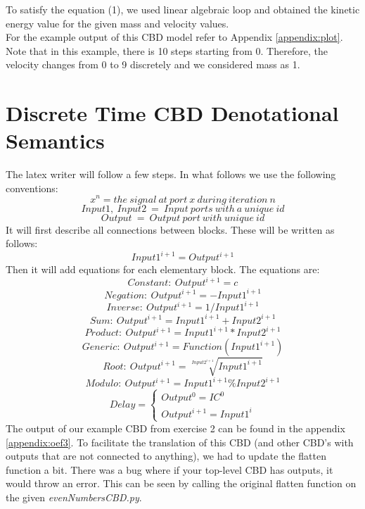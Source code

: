 \documentclass{article}
\begin{document}
To satisfy the equation (1), we used linear algebraic loop and obtained the kinetic energy value for the given mass and velocity values. \\

For the example output of this CBD model refer to Appendix \ref{appendix:plot}. Note that in this example, there is 10 steps starting from 0. Therefore, the velocity changes from 0 to 9 discretely and we considered mass as 1.



\section{Discrete Time CBD Denotational Semantics}
The latex writer will follow a few steps. In what follows we use the following conventions:
\[x^{n} = the\ signal\ at\ port\ x\ during\ iteration\ n\]
\[Input1,\ Input2\ =\ Input\ ports\ with\ a\ unique\ id\]
\[Output\ =\ Output\ port\ with\ unique\ id\]
 It will first describe all connections between blocks. These will be written as follows:
\[Input1^{i+1} = Output^{i+1}\]
Then it will add equations for each elementary block. The equations are:
\[Constant:\ Output^{i+1} = c\]
\[Negation:\ Output^{i+1} = -Input1^{i+1}\]
\[Inverse:\ Output^{i+1} = 1/Input1^{i+1}\]
\[Sum:\ Output^{i+1}=Input1^{i+1}+Input2^{i+1}\]
\[Product:\ Output^{i+1}=Input1^{i+1}*Input2^{i+1}\]
\[Generic:\ Output^{i+1}=Function(Input1^{i+1})\]
\[Root:\ Output^{i+1}=\sqrt[Input2^{i+1}]{Input1^{i+1}}\]
\[Modulo:\ Output^{i+1}=Input1^{i+1}\%Input2^{i+1}\]
\[
 Delay = 
  \begin{cases} 
    Output^{0} = IC^{0}\\
    Output^{i+1} = Input1^{i}
  \end{cases}
\]
The output of our example CBD from exercise 2 can be found in the appendix \ref{appendix:oef3}. To facilitate the translation of this CBD (and other CBD's with outputs that are not connected to anything), we had to update the flatten function a bit. There was a bug where if your top-level CBD has outputs, it would throw an error. This can be seen by calling the original flatten function on the given \textit{evenNumbersCBD.py}.
\newpage
\end{document}
